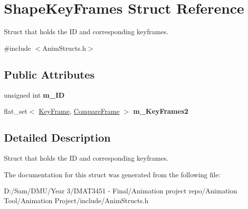 \hypertarget{struct_shape_key_frames}{}\section{Shape\+Key\+Frames Struct Reference}
\label{struct_shape_key_frames}


Struct that holds the ID and corresponding keyframes.  




{\ttfamily \#include $<$Anim\+Structs.\+h$>$}

\subsection*{Public Attributes}
\begin{DoxyCompactItemize}
\item 
\mbox{\label{struct_shape_key_frames_a8abd28a14574b2aa45bd2b291c2cadf9}} 
unsigned int {\bfseries m\+\_\+\+ID}
\item 
\mbox{\label{struct_shape_key_frames_a651f83d823261af06d50622f9a010b17}} 
flat\+\_\+set$<$ \hyperlink{struct_key_frame}{Key\+Frame}, \hyperlink{struct_compare_frame}{Compare\+Frame} $>$ {\bfseries m\+\_\+\+Key\+Frames2}
\end{DoxyCompactItemize}


\subsection{Detailed Description}
Struct that holds the ID and corresponding keyframes. 

The documentation for this struct was generated from the following file\+:\begin{DoxyCompactItemize}
\item 
D\+:/\+Sam/\+D\+M\+U/\+Year 3/\+I\+M\+A\+T3451 -\/ Final/\+Animation project repo/\+Animation Tool/\+Animation Project/include/Anim\+Structs.\+h\end{DoxyCompactItemize}
